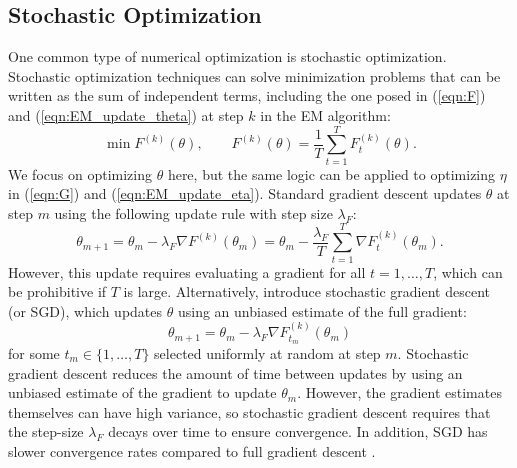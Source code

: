 \subsection{Stochastic Optimization}

One common type of numerical optimization is stochastic optimization. Stochastic optimization techniques can solve minimization problems that can be written as the sum of independent terms, including the one posed in (\ref{eqn:F}) and (\ref{eqn:EM_update_theta}) at step $k$ in the EM algorithm:
%
\begin{equation*}
    \min F^{(k)}(\theta), \qquad F^{(k)}(\theta) = \frac{1}{T}\sum_{t = 1}^T F^{(k)}_t(\theta).
\end{equation*}
%
We focus on optimizing $\theta$ here, but the same logic can be applied to optimizing $\eta$ in (\ref{eqn:G}) and (\ref{eqn:EM_update_eta}).
%
Standard gradient descent updates $\theta$ at step $m$ using the following update rule with step size $\lambda_F$:
%
\begin{equation*}
    \theta_{m+1} = \theta_{m} - \lambda_F \nabla F^{(k)}(\theta_{m}) =  \theta_{m} - \frac{\lambda_F}{T} \sum_{t=1}^T \nabla F^{(k)}_t(\theta_{m}).
\end{equation*}
%
However, this update requires evaluating a gradient for all $t = 1,\ldots,T$, which can be prohibitive if $T$ is large. Alternatively, \citet{Robbins:1951} introduce stochastic gradient descent (or SGD), which updates $\theta$ using an unbiased estimate of the full gradient:
%
\begin{equation*}
    \theta_{m+1} = \theta_{m} - \lambda_F \nabla F^{(k)}_{t_m}(\theta_{m})
\end{equation*}
%
for some $t_m \in \{1,\ldots,T\}$ selected uniformly at random at step $m$. Stochastic gradient descent reduces the amount of time between updates by using an unbiased estimate of the gradient to update $\theta_{m}$. However, the gradient estimates themselves can have high variance, so stochastic gradient descent requires that the step-size $\lambda_F$ decays over time to ensure convergence. In addition, SGD has slower convergence rates compared to full gradient descent \citep{Schmidt:2017}.

